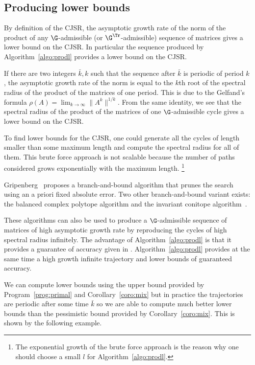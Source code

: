 \subsection{Producing lower bounds}
\label{sec:lb}


By definition of the CJSR, the asymptotic growth rate of the norm of the product of any $\G$-admissible (or $\G^\Tr $-admissible) sequence of matrices gives a lower bound on the CJSR.
In particular the sequence produced by Algorithm~\ref{algo:prodl} provides a lower bound on the CJSR.

If there are two integers $\bar{k},k$ such that the sequence after $\bar{k}$ is periodic of period $k$,
the asymptotic growth rate of the norm is equal to the $k$th root of the spectral radius of the product of the matrices of one period.
This is due to the Gelfand's formula $\rho(A) = \lim_{k \to \infty} \|A^k\|^{1/k}$.
From the same identity,
we see that the spectral radius of the product of the matrices of one $\G$-admissible cycle gives a lower bound on the CJSR.



To find lower bounds for the CJSR,
one could generate all the cycles of length smaller than some maximum length
and compute the spectral radius for all of them.
This brute force approach is not scalable because the number of paths considered grows exponentially with the maximum length.%
\footnote{The exponential growth of the brute force approach is the reason why one should choose a small $l$ for Algorithm~\ref{algo:prodl}.}

Gripenberg~\cite{gripenberg1996computing} proposes a branch-and-bound algorithm that prunes the search using an a priori fixed absolute error.
Two other branch-and-bound variant exists:
the balanced complex polytope algorithm \cite{guglielmi2008algorithm}
and the invariant conitope algorithm~\cite{jungers2014lifted}.

These algorithms can also be used to produce a $\G$-admissible sequence of matrices of high asymptotic growth rate
by reproducing the cycles of high spectral radius infinitely.
The advantage of Algorithm~\ref{algo:prodl} is that it provides a guarantee of accuracy given in .
Algorithm~\ref{algo:prodl} provides at the same time a high growth infinite trajectory and lower bounds of guaranteed accuracy.

We can compute lower bounds using the upper bound provided by Program~\ref{prog:primal} and Corollary~\ref{coro:mix}
but in practice the trajectories are periodic after some time $\bar{k}$ so we are able to compute
much better lower bounds than the pessimistic bound provided by Corollary~\ref{coro:mix}.
This is shown by the following example.


